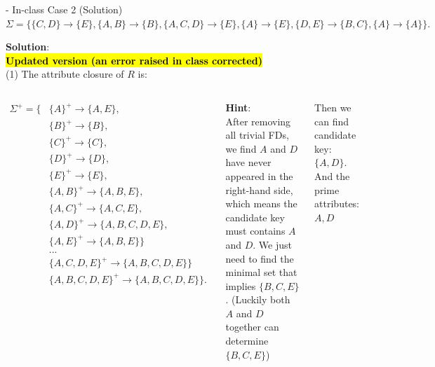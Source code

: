 \begin{frame}[fragile]{ - In-class Case 2 (Solution)}
	$\Sigma=\{\{C,D\} \rightarrow \{E\},\{A,B\} \rightarrow \{B\}, \{A,C,D\} \rightarrow \{E\},\{A\} \rightarrow \{E\},\{D,E\} \rightarrow \{B,C\},\{A\} \rightarrow \{A\}\}.$\\\vspace{5pt}
	
	\textbf{Solution}:\\
	\textcolor{red}{\textbf{\hl{Updated version (an error raised in class corrected)}}}\\
	(1) The attribute closure of $R$ is:
	\vspace{-10pt}\begin{columns}
	\begin{scriptsize}\begin{align*} 
		\Sigma^{+} = \{&\{A\}^{+} \rightarrow \{A,E\},\\
		&\{B\}^{+} \rightarrow \{B\},\\
		&\{C\}^{+} \rightarrow \{C\},\\
		&\{D\}^{+} \rightarrow \{D\},\\
		&\{E\}^{+} \rightarrow \{E\},\\
		&\{A,B\}^{+} \rightarrow \{A,B,E\},\\
		&\{A,C\}^{+} \rightarrow \{A,C,E\},\\
		&\{A,D\}^{+} \rightarrow \{A,B,C,D,E\},\\
		&\{A,E\}^{+} \rightarrow \{A,B,E\}\}\\
		& ...\\
		&\{A,C,D,E\}^{+} \rightarrow \{A,B,C,D,E\}\}\\
		&\{A,B,C,D,E\}^{+} \rightarrow \{A,B,C,D,E\}\}.
	\end{align*}\end{scriptsize} 
	
	\textbf{Hint}:\\
	After removing all trivial FDs, we find $A$ and $D$ have never appeared in the right-hand side, which means the candidate key must contains $A$ and $D$. We just need to find the minimal set that implies $\{B,C,E\}$. (Luckily both $A$ and $D$ together can determine $\{B,C,E\}$)\\\vspace{10pt}

	Then we can find candidate key: $\{A,D\}$. And the prime attributes: $A, D$
	\end{columns}
	
\end{frame}

